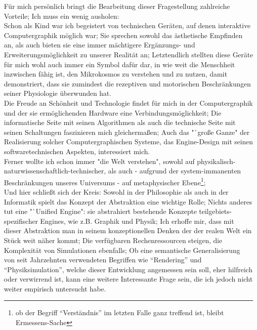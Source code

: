 Für mich persönlich bringt die Bearbeitung dieser Fragestellung zahlreiche Vorteile; Ich muss ein wenig ausholen:\\
Schon als Kind war ich begeistert von technischen Geräten, auf denen interaktive Computergraphik möglich war; Sie sprechen sowohl das ästhetische Empfinden an, als auch bieten sie eine immer mächtigere Ergänzungs- und  Erweiterungsmöglichkeit zu unserer Realität an; Letztendlich stellten diese Geräte für mich wohl auch immer ein Symbol dafür dar, in wie weit die Menschheit inzwischen fähig ist, den Mikrokosmos zu verstehen und zu nutzen, damit demonstriert, dass sie zumindest die rezeptiven und motorischen Beschränkungen seiner Physiologie überwunden hat.\\
Die Freude an Schönheit und Technologie findet für mich in der Computergraphik und der sie ermöglichenden Hardware eine Verbindungsmöglichkeit; Die informatische Seite mit seinen Algorithmen als auch die technische Seite mit seinen Schaltungen faszinieren mich gleichermaßen; Auch das "`große Ganze" der Realisierung solcher Computergraphischen Systeme, das Engine-Design mit seinen softwaretechnischen Aspekten, interessiert mich.\\
Ferner wollte ich schon immer "die Welt verstehen", sowohl auf physikalisch-naturwissenschaftlich-technischer, als auch - aufgrund der system-immanenten Beschränkungen unseres Universums - auf metaphysischer Ebene\footnote{ob der Begriff "`Verständnis"' im letzten Falle ganz treffend ist, bleibt Ermessens-Sache};\\

Und hier schließt sich der Kreis: Sowohl in der Philosophie als auch in der Informatik spielt das Konzept der Abstraktion eine wichtige Rolle; Nichts anderes tut eine "`Unified Engine": sie abstrahiert bestehende Konzepte teilgebiets-spezifischer Engines, wie z.B. Graphik und Physik; Ich erhoffe mir, dass mit dieser Abstraktion man in seinem konzeptionellen Denken der der realen Welt ein Stück weit näher kommt; Die verfügbaren Rechenressourcen steigen, die Komplexität von Simulationen ebenfalls; Ob eine semantische Generalisierung von seit Jahrzehnten verwendeten Begriffen wie "`Rendering"' und "`Physiksimulation"', welche dieser Entwicklung angemessen sein soll, eher hilfreich oder verwirrend ist, kann eine weitere Interessante Frage sein, die ich jedoch nicht weiter empirisch untersucht habe.\\

